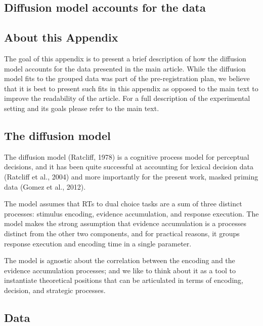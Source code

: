 \documentclass[
  english,
  man]{apa6}
\begin{document}
\begin{appendix}
\hypertarget{diffusion-model-accounts-for-the-data}{%
\section{Diffusion model accounts for the
data}\label{diffusion-model-accounts-for-the-data}}

\hypertarget{about-this-appendix}{%
\subsection{About this Appendix}\label{about-this-appendix}}

The goal of this appendix is to present a brief description of how the
diffusion model accounts for the data presented in the main article.
While the diffusion model fits to the grouped data was part of the
pre-registration plan, we believe that it is best to present such fits
in this appendix as opposed to the main text to improve the readability
of the article. For a full description of the experimental setting and
its goals please refer to the main text.

\hypertarget{the-diffusion-model}{%
\subsection{The diffusion model}\label{the-diffusion-model}}

The diffusion model (Ratcliff, 1978) is a cognitive process model for
perceptual decisions, and it has been quite successful at accounting for
lexical decision data (Ratcliff et al., 2004) and more importantly for
the present work, masked priming data (Gomez et al., 2012).

The model assumes that RTs to dual choice tasks are a sum of three
distinct processes: stimulus encoding, evidence accumulation, and
response execution. The model makes the strong assumption that evidence
accumulation is a processes distinct from the other two components, and
for practical reasons, it groups response execution and encoding time in
a single parameter.

The model is agnostic about the correlation between the encoding and the
evidence accumulation processes; and we like to think about it as a tool
to instantiate theoretical positions that can be articulated in terms of
encoding, decision, and strategic processes.

\hypertarget{data}{%
\subsection{Data}\label{data}}


\end{appendix}
\end{document}
